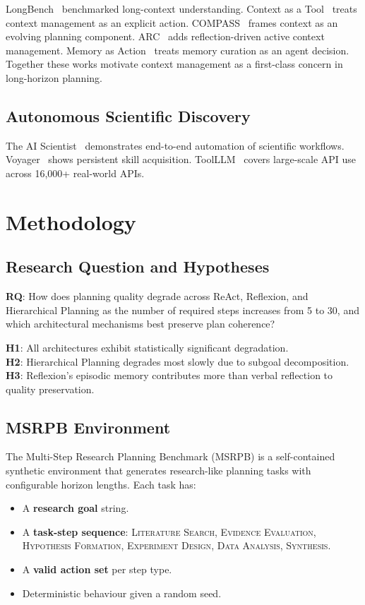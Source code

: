 \documentclass[conference]{IEEEtran}
\begin{document}
LongBench~\cite{bai2024longbench} benchmarked long-context understanding.
Context as a Tool~\cite{liu2026context} treats context management as an
explicit action. COMPASS~\cite{wan2026compass} frames context as an evolving
planning component. ARC~\cite{yao2026arc} adds reflection-driven active context
management. Memory as Action~\cite{zhang2026memory} treats memory curation as
an agent decision. Together these works motivate context management as a
first-class concern in long-horizon planning.

\subsection{Autonomous Scientific Discovery}

The AI Scientist~\cite{lu2024aiscientist} demonstrates end-to-end automation of
scientific workflows. Voyager~\cite{wang2023voyager} shows persistent skill
acquisition. ToolLLM~\cite{qin2024toolllm} covers large-scale API use across
16{,}000+ real-world APIs.

\section{Methodology}

\subsection{Research Question and Hypotheses}

\textbf{RQ}: How does planning quality degrade across ReAct, Reflexion, and
Hierarchical Planning as the number of required steps increases from 5 to 30,
and which architectural mechanisms best preserve plan coherence?

\noindent\textbf{H1}: All architectures exhibit statistically significant
degradation.\\
\textbf{H2}: Hierarchical Planning degrades most slowly due to subgoal
decomposition.\\
\textbf{H3}: Reflexion's episodic memory contributes more than verbal
reflection to quality preservation.

\subsection{MSRPB Environment}

The Multi-Step Research Planning Benchmark (MSRPB) is a self-contained
synthetic environment that generates research-like planning tasks with
configurable horizon lengths. Each task has:
\begin{itemize}
  \item A \textbf{research goal} string.
  \item A \textbf{task-step sequence}: \textsc{Literature Search},
        \textsc{Evidence Evaluation}, \textsc{Hypothesis Formation},
        \textsc{Experiment Design}, \textsc{Data Analysis}, \textsc{Synthesis}.
  \item A \textbf{valid action set} per step type.
  \item Deterministic behaviour given a random seed.
\end{itemize}
\end{document}
